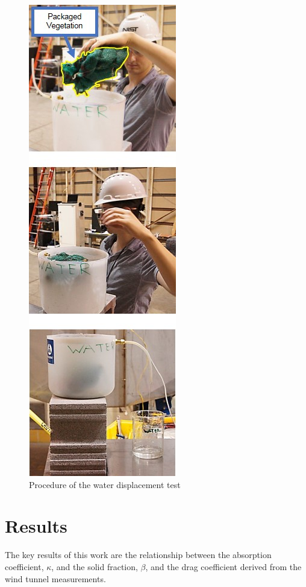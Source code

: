 \documentclass[12pt]{article}
\begin{document}
\begin{figure} [!]
	\centering 	\includegraphics[height=0.95\textheight,keepaspectratio]{Picture7.jpg}
	\caption{Procedure of the water displacement test}
	\label{fig:wdt}
\end{figure}

\pagebreak



\section{Results}
\label{sec:results}

The key results of this work are the relationship between the absorption coefficient, $\kappa$, and the solid fraction, $\beta$, and the drag coefficient derived from the wind tunnel measurements.
\end{document}
